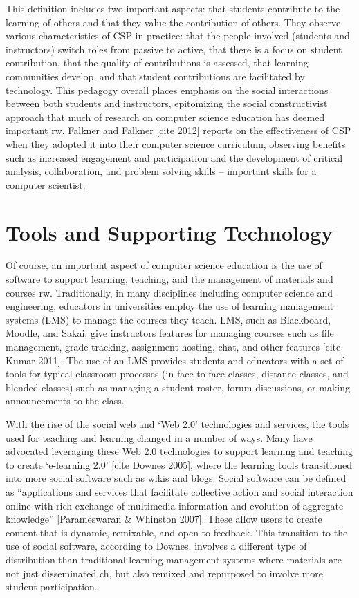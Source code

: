 This definition includes two important aspects: that students contribute to the learning of others and that they value the contribution of others. They observe various characteristics of CSP in practice: that the people involved (students and instructors) switch roles from passive to active, that there is a focus on student contribution, that the quality of contributions is assessed, that learning communities develop, and that student contributions are facilitated by technology. This pedagogy overall places emphasis on the social interactions between both students and instructors, epitomizing the social constructivist approach that much of research on computer science education has deemed important {rw}. Falkner and Falkner [cite 2012] reports on the effectiveness of CSP when they adopted it into their computer science curriculum, observing benefits such as increased engagement and participation and the development of critical analysis, collaboration, and problem solving skills – important skills for a computer scientist.

\section{Tools and Supporting Technology}

Of course, an important aspect of computer science education is the use of software to support learning, teaching, and the management of materials and courses {rw}. Traditionally, in many disciplines including computer science and engineering, educators in universities employ the use of learning management systems (LMS) to manage the courses they teach. LMS, such as Blackboard, Moodle, and Sakai, give instructors features for managing courses such as file management, grade tracking, assignment hosting, chat, and other features [cite Kumar 2011]. The use of an LMS provides students and educators with a set of tools for typical classroom processes (in face-to-face classes, distance classes, and blended classes) such as managing a student roster, forum discussions, or making announcements to the class.

With the rise of the social web and ‘Web 2.0’ technologies and services, the tools used for teaching and learning changed in a number of ways. Many have advocated leveraging these Web 2.0 technologies to support learning and teaching to create ‘e-learning 2.0’ [cite Downes 2005], where the learning tools transitioned into more social software such as wikis and blogs. Social software can be defined as “applications and services that facilitate collective action and social interaction online with rich exchange of multimedia information and evolution of aggregate knowledge” [Parameswaran & Whinston 2007]. These allow users to create content that is dynamic, remixable, and open to feedback. This transition to the use of social software, according to Downes, involves a different type of distribution than traditional learning management systems where materials are not just disseminated {ch}, but also remixed and repurposed to involve more student participation.

